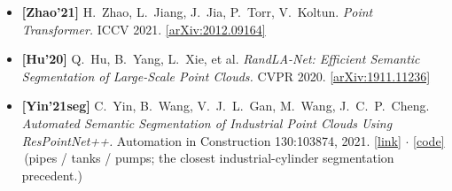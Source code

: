 \documentclass[10pt,a4paper]{article}
\begin{document}
{\begin{itemize}[leftmargin=1.4em,itemsep=3pt,topsep=2pt]
  F.~Goulette, L.~J.~Guibas. \emph{KPConv: Flexible and Deformable Convolution for Point
  Clouds.} ICCV 2019. \href{https://arxiv.org/abs/1904.08889}{[arXiv:1904.08889]}
  \,(point-convolution segmentation backbone.)
  \item \textbf{[Zhao'21]} H.~Zhao, L.~Jiang, J.~Jia, P.~Torr, V.~Koltun. \emph{Point
  Transformer.} ICCV 2021. \href{https://arxiv.org/abs/2012.09164}{[arXiv:2012.09164]}
  \item \textbf{[Hu'20]} Q.~Hu, B.~Yang, L.~Xie, et al. \emph{RandLA-Net: Efficient Semantic
  Segmentation of Large-Scale Point Clouds.} CVPR 2020.
  \href{https://arxiv.org/abs/1911.11236}{[arXiv:1911.11236]}
  \item \textbf{[Yin'21seg]} C.~Yin, B.~Wang, V.~J.~L.~Gan, M.~Wang, J.~C.~P.~Cheng.
  \emph{Automated Semantic Segmentation of Industrial Point Clouds Using ResPointNet++.}
  Automation in Construction 130:103874, 2021.
  \href{https://www.sciencedirect.com/science/article/abs/pii/S0926580521003253}{[link]}
  $\cdot$ \href{https://github.com/PointCloudYC/ResPointNet2}{[code]} \,(pipes / tanks /
  pumps; the closest industrial-cylinder segmentation precedent.)
\end{itemize}

}
\end{document}
